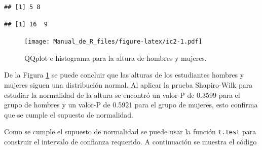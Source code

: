 \documentclass[10pt,]{krantz}
\makeatletter
\newenvironment{Shaded}{\begin{snugshade}}{\end{snugshade}}
\newcommand{\KeywordTok}[1]{\textcolor[rgb]{0.13,0.29,0.53}{\textbf{#1}}}
\newcommand{\DataTypeTok}[1]{\textcolor[rgb]{0.13,0.29,0.53}{#1}}
\newcommand{\DecValTok}[1]{\textcolor[rgb]{0.00,0.00,0.81}{#1}}
\newcommand{\StringTok}[1]{\textcolor[rgb]{0.31,0.60,0.02}{#1}}
\newcommand{\OperatorTok}[1]{\textcolor[rgb]{0.81,0.36,0.00}{\textbf{#1}}}
\newcommand{\NormalTok}[1]{#1}
\newenvironment{kframe}{%
\medskip{}
\setlength{\fboxsep}{.8em}
 \def\at@end@of@kframe{}%
 \ifinner\ifhmode%
  \def\at@end@of@kframe{\end{minipage}}%
  \begin{minipage}{\columnwidth}%
 \fi\fi%
 \def\FrameCommand##1{\hskip\@totalleftmargin \hskip-\fboxsep
 \colorbox{shadecolor}{##1}\hskip-\fboxsep
     \hskip-\linewidth \hskip-\@totalleftmargin \hskip\columnwidth}%
 \MakeFramed {\advance\hsize-\width
   \@totalleftmargin\z@ \linewidth\hsize
   \@setminipage}}%
 {\par\unskip\endMakeFramed%
 \at@end@of@kframe}
\renewenvironment{Shaded}{\begin{kframe}}{\end{kframe}}
\makeatother
\begin{document}
\begin{verbatim}
## [1] 5 8
\end{verbatim}

\begin{Shaded}
\end{Shaded}

\begin{verbatim}
## [1] 16  9
\end{verbatim}

\begin{Shaded}
\end{Shaded}

\begin{figure}
\centering
\texttt{[image: Manual\_de\_R\_files/figure-latex/ic2-1.pdf]}
\caption{\label{fig:ic2}QQplot e histograma para la altura de hombres y
mujeres.}
\end{figure}

De la Figura \ref{fig:ic2} se puede concluir que las alturas de los
estudiantes hombres y mujeres siguen una distribución normal. Al aplicar
la prueba Shapiro-Wilk para estudiar la normalidad de la altura se
encontró un valor-P de 0.3599 para el grupo de hombres y un valor-P de
0.5921 para el grupo de mujeres, esto confirma que se cumple el supuesto
de normalidad.

Como se cumple el supuesto de normalidad se puede usar la función
\texttt{t.test} para construir el intervalo de confianza requerido. A
continuación se muestra el código
\end{document}
